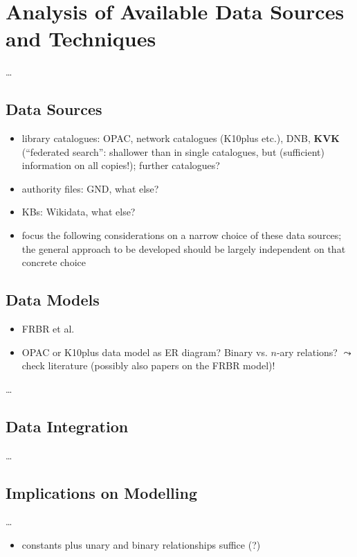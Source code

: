 \chapter{Analysis of Available Data Sources and Techniques}
\label{chap:analysis}

\dots

\section{Data Sources}
\label{sec:data_sources}

\begin{itemize}
  \item
    library catalogues: OPAC, network catalogues (K10plus etc.), DNB,
    \textbf{KVK} (\enquote{federated search}: shallower than in single catalogues,
    but (sufficient) information on all copies!);
    further catalogues?
  \item
    authority files: GND, what else?
  \item
    KBs: Wikidata, what else?
  \item
    focus the following considerations on a narrow choice of these data sources;
    the general approach to be developed should be largely independent on that concrete choice
\end{itemize}

\section{Data Models}
\label{sec:data_models}

\begin{itemize}
  \item
    FRBR et al.
  \item 
    OPAC or K10plus data model as ER diagram? Binary vs. $n$-ary relations?
    $\leadsto$ check literature (possibly also papers on the FRBR model)!
\end{itemize}

\dots

\section{Data Integration}
\label{sec:data_integration}

\dots

\section{Implications on Modelling}
\label{sec:implications_on_modelling}

\dots

\begin{itemize}
  \item
    constants plus unary and binary relationships suffice (?)
\end{itemize}


